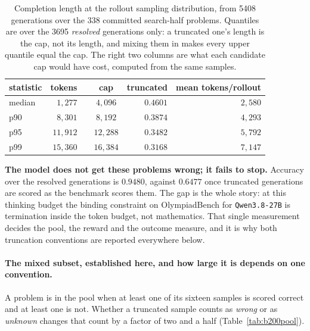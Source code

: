 \begin{table}[t]
\centering\small
\caption{Completion length at the rollout sampling distribution, from 5408 generations over
the 338 committed search-half problems. Quantiles are over the 3695 \emph{resolved}
generations only: a truncated one's length is the cap, not its length, and mixing them in
makes every upper quantile equal the cap. The right two columns are what each candidate cap
would have cost, computed from the same samples.}
\label{tab:b200cap}
\begin{tabular}{lrr@{\qquad}crr}
\toprule
statistic & tokens & & cap & truncated & mean tokens/rollout \\
\midrule
median             & $1{,}277$  & & $4{,}096$  & $0.4601$ & $2{,}580$ \\
p90                & $8{,}301$  & & $8{,}192$  & $0.3874$ & $4{,}293$ \\
p95                & $11{,}912$ & & $12{,}288$ & $0.3482$ & $5{,}792$ \\
p99                & $15{,}360$ & & $16{,}384$ & $0.3168$ & $7{,}147$ \\
\bottomrule
\end{tabular}
\end{table}

\textbf{The model does not get these problems wrong; it fails to stop.} Accuracy over the
resolved generations is $\mathbf{0.9480}$, against $0.6477$ once truncated generations are
scored as the benchmark scores them. The gap is the whole story: at this thinking budget the
binding constraint on OlympiadBench for \texttt{Qwen3.8-27B} is termination inside the token
budget, not mathematics. That single measurement decides the pool, the reward and the outcome
measure, and it is why both truncation conventions are reported everywhere below.

\paragraph{The mixed subset, established here, and how large it is depends on one convention.}
A problem is in the pool when at least one of its sixteen samples is scored correct and at
least one is not. Whether a truncated sample counts as \emph{wrong} or as \emph{unknown}
changes that count by a factor of two and a half (Table~\ref{tab:b200pool}).

